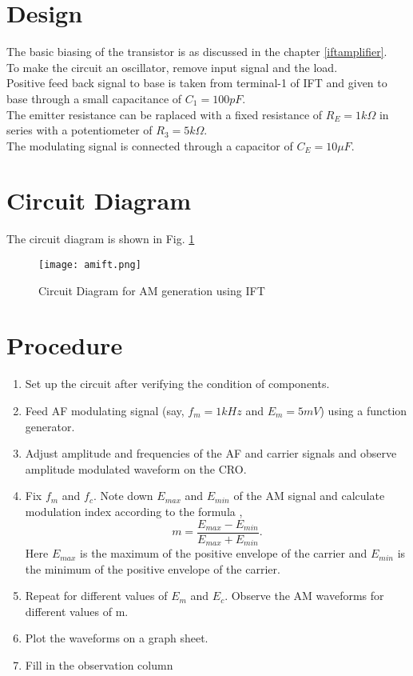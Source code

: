 \section*{Design}
The basic biasing of the transistor is as discussed in the chapter \ref{iftamplifier}.\\
To make the circuit an oscillator, remove input signal and the load.\\
Positive feed back signal to base is taken from terminal-1 of IFT and given to base through a small capacitance of $C_1=100 pF$. \\
The emitter resistance can be raplaced with a fixed resistance of $R_E=1k\Omega$ in series with a potentiometer of $R_3=5k\Omega$.\\
The modulating signal is connected through a capacitor of $C_E=10\mu F$.
\section*{Circuit Diagram}
The circuit diagram is shown in Fig. \ref{amiftpng}
\begin{figure}
\texttt{[image: amift.png]}
\caption{Circuit Diagram for AM generation using IFT}
\label{amiftpng}
\end{figure}
\section*{Procedure}

\begin{enumerate}
\item
Set up the circuit after verifying the condition of components.
\item
Feed AF modulating signal (say, $f_m=1kHz$ and $E_m=5mV$) using a function generator.
\item
Adjust amplitude and frequencies of the AF and carrier signals and observe amplitude modulated waveform on the CRO.
\item
Fix $f_m$ and $f_c$. Note down $E_{max}$ and $E_{min}$ of the AM signal and calculate modulation index according to the formula ,
\begin{equation}
m=\frac{E_{max}-E_{min}}{E_{max}+E_{min}}.
\end{equation}
Here $E_{max}$ is the maximum of the positive envelope of the carrier and $E_{min}$ is the minimum of the positive envelope of the carrier.
\item
Repeat for different values of $E_m$ and $E_c$. Observe the AM waveforms for different values of m.
\item
Plot the waveforms on a graph sheet.
\item

Fill in the observation column
\end{enumerate}


